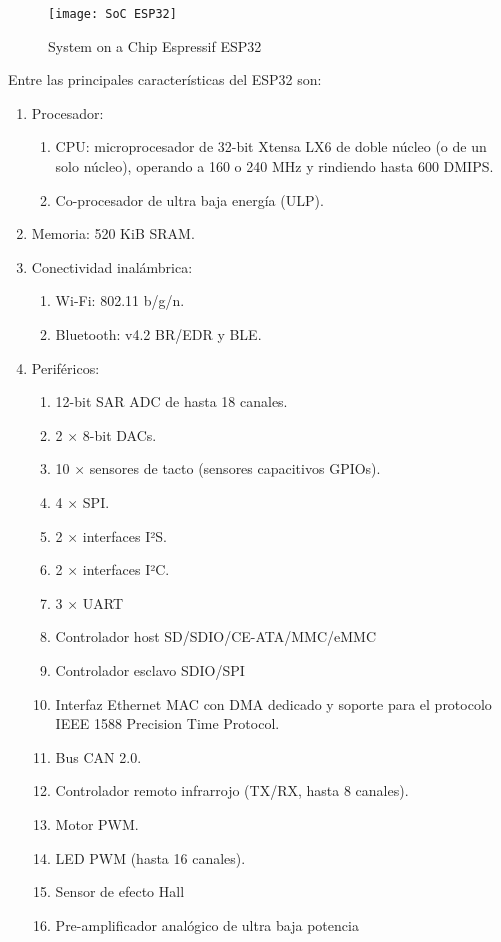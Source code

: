 \begin{figure}[h]
	\centering
	\texttt{[image: SoC ESP32]}
	\caption{System on a Chip Espressif ESP32}
\end{figure}

Entre las principales características del ESP32 son:
\begin{enumerate}
	\item Procesador:
	\begin{enumerate}
		\item CPU: microprocesador de 32-bit Xtensa LX6 de doble núcleo (o de un solo núcleo), operando a 160 o 240 MHz y rindiendo hasta 600 DMIPS.
		\item Co-procesador de ultra baja energía (ULP).
	\end{enumerate}
	\item Memoria: 520 KiB SRAM.
	\item Conectividad inalámbrica:
	\begin{enumerate}
		\item Wi-Fi: 802.11 b/g/n.
		\item Bluetooth: v4.2 BR/EDR y BLE.
	\end{enumerate}
	\item Periféricos:
	\begin{enumerate}
		\item 12-bit SAR ADC de hasta 18 canales.
		\item 2 × 8-bit DACs.
		\item 10 × sensores de tacto (sensores capacitivos GPIOs).
		\item 4 × SPI.
		\item 2 × interfaces I²S.
		\item 2 × interfaces I²C.
		\item 3 × UART
		\item Controlador host SD/SDIO/CE-ATA/MMC/eMMC
		\item Controlador esclavo SDIO/SPI
		\item Interfaz Ethernet MAC con DMA dedicado y soporte para el protocolo IEEE 1588 Precision Time Protocol.
		\item Bus CAN 2.0.
		\item Controlador remoto infrarrojo (TX/RX, hasta 8 canales).
		\item Motor PWM.
		\item LED PWM (hasta 16 canales).
		\item Sensor de efecto Hall
		\item Pre-amplificador analógico de ultra baja potencia

\end{enumerate}
\end{enumerate}
